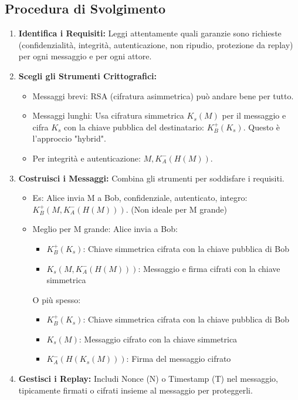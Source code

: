 \subsection{Procedura di Svolgimento}
\begin{enumerate}[label=\arabic*.]
    \item \textbf{Identifica i Requisiti:} Leggi attentamente quali garanzie sono richieste (confidenzialità, integrità, autenticazione, non ripudio, protezione da replay) per ogni messaggio e per ogni attore.
    \item \textbf{Scegli gli Strumenti Crittografici:}
    \begin{itemize}
        \item Messaggi brevi: RSA (cifratura asimmetrica) può andare bene per tutto.
        \item Messaggi lunghi: Usa cifratura simmetrica $K_s(M)$ per il messaggio e cifra $K_s$ con la chiave pubblica del destinatario: $K_B^+(K_s)$. Questo è l'approccio "hybrid".
        \item Per integrità e autenticazione: $M, K_A^-(H(M))$.
    \end{itemize}
    \item \textbf{Costruisci i Messaggi:} Combina gli strumenti per soddisfare i requisiti.
    \begin{itemize}
        \item Es: Alice invia M a Bob, confidenziale, autenticato, integro: $K_B^+( M, K_A^-(H(M)) )$. (Non ideale per M grande)
        \item Meglio per M grande: Alice invia a Bob:
        \begin{itemize}
            \item $K_B^+(K_s)$: Chiave simmetrica cifrata con la chiave pubblica di Bob
            \item $K_s(M, K_A^-(H(M)))$: Messaggio e firma cifrati con la chiave simmetrica
        \end{itemize}
        O più spesso:
        \begin{itemize}
            \item $K_B^+(K_s)$: Chiave simmetrica cifrata con la chiave pubblica di Bob
            \item $K_s(M)$: Messaggio cifrato con la chiave simmetrica
            \item $K_A^-(H( K_s(M) ))$: Firma del messaggio cifrato
        \end{itemize}
    \end{itemize}
    \item \textbf{Gestisci i Replay:} Includi Nonce (N) o Timestamp (T) nel messaggio, tipicamente firmati o cifrati insieme al messaggio per proteggerli.

\end{enumerate}
